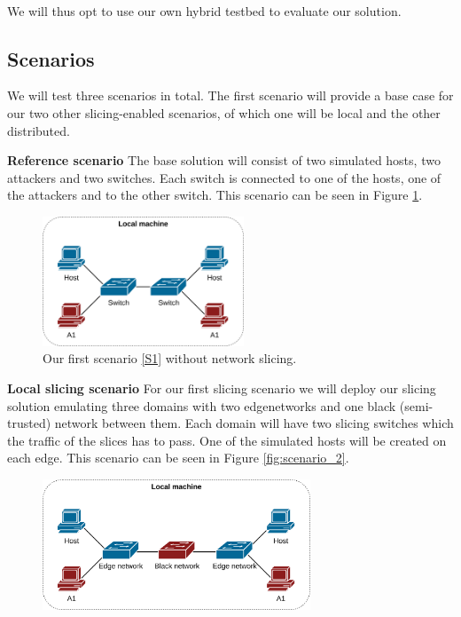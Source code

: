 \paragraph{} We will thus opt to use our own hybrid testbed to evaluate our solution.

\subsection{Scenarios}
\label{scenarios}
We will test three scenarios in total. The first scenario will provide a base case for our two other slicing-enabled scenarios, of which one will be local and the other distributed.

\begin{description}[style=multiline, labelwidth=0.7cm]
    \item[\namedlabel{S1}{S1}] \textbf{Reference scenario} The base solution will consist of two simulated hosts, two attackers and two switches. Each switch is connected to one of the hosts, one of the attackers and to the other switch. This scenario can be seen in Figure \ref{fig:scenario_1}.
    \begin{figure}[ht]
        \centering
        \includegraphics[width=6cm]{images/chapter_7/scenario_1.png}
        \caption[Validation Scenario 1]{Our first scenario \ref{S1} without network slicing.}
        \label{fig:scenario_1}
    \end{figure}
    \item[\namedlabel{S2}{S2}] \textbf{Local slicing scenario} For our first slicing scenario we will deploy our slicing solution emulating three domains with two \gls{edgenetwork}s and one black (semi-trusted) network between them. Each domain will have two slicing switches which the traffic of the slices has to pass. One of the simulated hosts will be created on each edge. This scenario can be seen in Figure \ref{fig:scenario_2}.
    \begin{figure}[ht]
        \centering
        \includegraphics[width=8cm]{images/chapter_7/scenario_2.png}

\end{figure}
\end{description}
